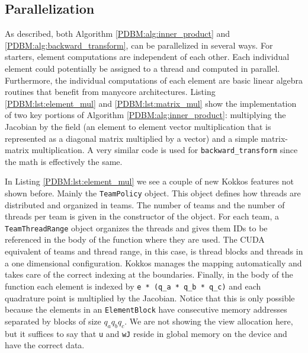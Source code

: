 \documentclass{ccr16}
\begin{document}
{        \subsection{Parallelization}
        {
            As described, both Algorithm \ref{PDBM:alg:inner_product} and \ref{PDBM:alg:backward_transform}, can be parallelized in several ways. For starters, element computations are independent of each other. Each individual element could potentially be assigned to a thread and computed in parallel. Furthermore, the individual computations of each element are basic linear algebra routines that benefit from manycore architectures. Listing \ref{PDBM:lst:element_mul} and \ref{PDBM:lst:matrix_mul} show the implementation of two key portions of Algorithm \ref{PDBM:alg:inner_product}: multiplying the Jacobian by the field (an element to element vector multiplication that is represented as a diagonal matrix multiplied by a vector) and a simple matrix-matrix multiplication. A very similar code is used for \texttt{backward\_transform} since the math is effectively the same.

            

            In Listing \ref{PDBM:lst:element_mul} we see a couple of new Kokkos features not shown before. Mainly the \texttt{TeamPolicy} object. This object defines how threads are distributed and organized in teams. The number of teams and the number of threads per team is given in the constructor of the object. For each team, a \texttt{TeamThreadRange} object organizes the threads and gives them IDs to be referenced in the body of the function where they are used. The CUDA equivalent of teams and thread range, in this case, is thread blocks and threads in a one dimensional configuration. Kokkos manages the mapping automatically and takes care of the correct indexing at the boundaries. Finally, in the body of the function each element is indexed by \texttt{e * (q\_a * q\_b * q\_c)} and each quadrature point is multiplied by the Jacobian. Notice that this is only possible because the elements in an \texttt{ElementBlock} have consecutive memory addresses separated by blocks of size $q_{a} q_{b} q_{c}$. We are not showing the view allocation here, but it suffices to say that \texttt{u} and \texttt{wJ} reside in global memory on the device and have the correct data.

}}
\end{document}
